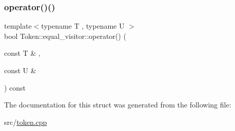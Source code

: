 \subsubsection{\texorpdfstring{operator()()}{operator()()}\hspace{0.1cm}{\footnotesize\ttfamily [4/4]}}
{\footnotesize\ttfamily template$<$typename T , typename U $>$ \\
bool Token\+::equal\+\_\+visitor\+::operator() (\begin{DoxyParamCaption}\item[{const T \&}]{,  }\item[{const U \&}]{ }\end{DoxyParamCaption}) const\hspace{0.3cm}{\ttfamily [inline]}}



The documentation for this struct was generated from the following file\+:\begin{DoxyCompactItemize}
\item 
src/\hyperlink{token_8cpp}{token.\+cpp}\end{DoxyCompactItemize}
